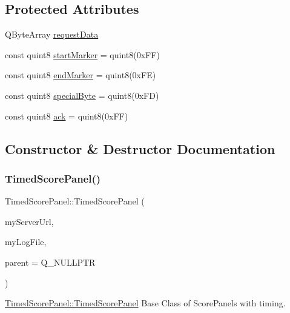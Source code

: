 \subsection*{Protected Attributes}
\begin{DoxyCompactItemize}
\item 
Q\+Byte\+Array \mbox{\hyperlink{classTimedScorePanel_ab709153aa0a1ea23d2209c359b3adfe0}{request\+Data}}
\item 
const quint8 \mbox{\hyperlink{classTimedScorePanel_ad6785d83eabd109d61604d1893703b25}{start\+Marker}} = quint8(0x\+F\+F)
\item 
const quint8 \mbox{\hyperlink{classTimedScorePanel_a1233e5ee97ca72e98b37c5fc81a2a94d}{end\+Marker}} = quint8(0x\+F\+E)
\item 
const quint8 \mbox{\hyperlink{classTimedScorePanel_a59e028723640161364bf730557737b54}{special\+Byte}} = quint8(0x\+F\+D)
\item 
const quint8 \mbox{\hyperlink{classTimedScorePanel_a58f99170c990833d0fd52e33015a1da1}{ack}} = quint8(0x\+F\+F)
\end{DoxyCompactItemize}


\subsection{Constructor \& Destructor Documentation}
\mbox{\label{classTimedScorePanel_ac8b702def5462d859d6aa9d430d3aa86}} 
\subsubsection{\texorpdfstring{Timed\+Score\+Panel()}{TimedScorePanel()}}
{\footnotesize\ttfamily Timed\+Score\+Panel\+::\+Timed\+Score\+Panel (\begin{DoxyParamCaption}\item[{Q\+String}]{my\+Server\+Url,  }\item[{Q\+File $\ast$}]{my\+Log\+File,  }\item[{Q\+Widget $\ast$}]{parent = {\ttfamily Q\+\_\+NULLPTR} }\end{DoxyParamCaption})}



\mbox{\hyperlink{classTimedScorePanel_ac8b702def5462d859d6aa9d430d3aa86}{Timed\+Score\+Panel\+::\+Timed\+Score\+Panel}} Base Class of Score\+Panels with timing. 


